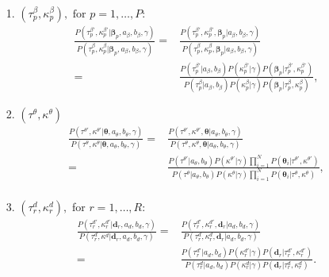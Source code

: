 \documentclass[a4paper]{article}
\begin{document}
\begin{itemize}
	\item [1.] $(\tau^\beta_p, \kappa^\beta_p), \mbox{ for } p=1,\ldots,P$:
	\begin{equation}
	\begin{aligned}
	\frac{P(\tau^{\beta\prime}_p, \kappa^{\beta\prime}_p|\boldsymbol{\beta}_p, a_\beta, b_\beta,\gamma)}{P(\tau^\beta_p, \kappa^\beta_p|\boldsymbol{\beta}_p, a_\beta, b_\beta,\gamma)}=&\frac{P(\tau^{\beta\prime}_p, \kappa^{\beta\prime}_p, \boldsymbol{\beta}_p| a_\beta, b_\beta,\gamma)}{P(\tau^\beta_p, \kappa^\beta_p,\boldsymbol{\beta}_p|a_\beta, b_\beta,\gamma)}\\=&\frac{P(\tau^{\beta\prime}_p|a_\beta, b_\beta)P(\kappa^{\beta\prime}_p|\gamma)P( \boldsymbol{\beta}_p|\tau^{\beta\prime}_p, \kappa^{\beta\prime}_p) }{P(\tau^{\beta}_p|a_\beta, b_\beta)P(\kappa^{\beta}_p|\gamma)P( \boldsymbol{\beta}_p|\tau^{\beta}_p, \kappa^{\beta}_p)},
	\end{aligned}
	\end{equation}
	\item [2.] $(\tau^\theta, \kappa^\theta)$
	\begin{equation}
	\begin{aligned}
	\frac{P(\tau^{\theta\prime}, \kappa^{\theta\prime}|\boldsymbol{\theta}, a_\theta, b_\theta,\gamma)}{P(\tau^\theta, \kappa^\theta|\boldsymbol{\theta}, a_\theta, b_\theta,\gamma)}=&\frac{P(\tau^{\theta\prime}, \kappa^{\theta\prime}, \boldsymbol{\theta}| a_\theta, b_\theta,\gamma)}{P(\tau^\theta, \kappa^\theta,\boldsymbol{\theta}|a_\theta, b_\theta,\gamma)}\\=&\frac{P(\tau^{\theta\prime}|a_\theta, b_\theta)P(\kappa^{\theta\prime}|\gamma)\prod_{i=1}^N P(\boldsymbol{\theta}_i|\tau^{\theta\prime}, \kappa^{\theta\prime}) }{P(\tau^{\theta}|a_\theta, b_\theta)P(\kappa^{\theta}|\gamma)\prod_{i=1}^NP( \boldsymbol{\theta}_i|\tau^{\theta}, \kappa^{\theta})},\\
	\end{aligned}
	\end{equation}
	\item [3.] $(\tau_r^d, \kappa_r^d),$ for $r=1,\ldots,R$:
	\begin{equation}
	\begin{aligned}
	\frac{P(\tau_r^{d\prime}, \kappa_r^{d\prime}|\boldsymbol{d}_r, a_d, b_d,\gamma)}{P(\tau_r^d, \kappa^d|\boldsymbol{d}_r, a_d, b_d,\gamma)}=&\frac{P(\tau_r^{d\prime}, \kappa_r^{d\prime}, \boldsymbol{d}_r| a_d, b_d,\gamma)}{P( \tau_r^d, \kappa_r^d, \boldsymbol{d}_r| a_d, b_d,\gamma)}\\=&\frac{P(\tau_r^{d\prime}| a_d, b_d)P(\kappa_r^{d\prime}|\gamma)P(\boldsymbol{d}_r|\tau_r^{d\prime}, \kappa_r^{d\prime}) }{P(\tau_r^d| a_d, b_d)P(\kappa_r^{d}|\gamma)P( \boldsymbol{d}_r| \tau_r^{d},\kappa_r^{d})}.
	\end{aligned}
	\end{equation}
\end{itemize}
\end{document}
